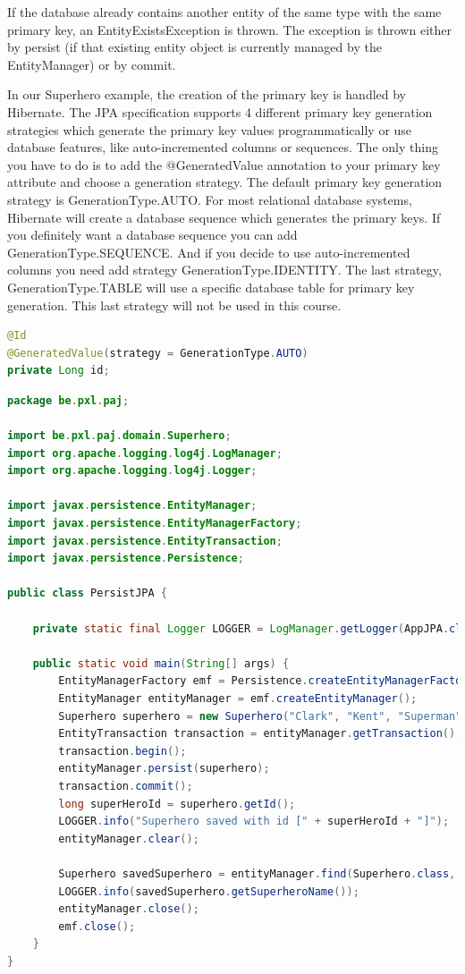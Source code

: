 If the database already contains another entity of the same type with the same primary key, an EntityExistsException is thrown. The exception is thrown either by persist (if that existing entity object is currently managed by the EntityManager) or by commit.

In our Superhero example, the creation of the primary key is handled by Hibernate.
The JPA specification supports 4 different primary key generation strategies which generate the primary key values programmatically or use database features, like auto-incremented columns or sequences. The only thing you have to do is to add the @GeneratedValue annotation to your primary key attribute and choose a generation strategy. The default primary key generation strategy is GenerationType.AUTO. For most relational database systems, Hibernate will create a database sequence which generates the primary keys.  If you definitely want a database sequence you can add GenerationType.SEQUENCE. And if you decide to use auto-incremented columns you need add strategy GenerationType.IDENTITY. 
The last strategy, GenerationType.TABLE will use a specific database table for primary key generation. This last strategy will not be used in this course.

\begin{lstlisting}[frame=single, language=java]
@Id
@GeneratedValue(strategy = GenerationType.AUTO)
private Long id;
\end{lstlisting}


\begin{lstlisting}[frame=single, language=java]
package be.pxl.paj;

import be.pxl.paj.domain.Superhero;
import org.apache.logging.log4j.LogManager;
import org.apache.logging.log4j.Logger;

import javax.persistence.EntityManager;
import javax.persistence.EntityManagerFactory;
import javax.persistence.EntityTransaction;
import javax.persistence.Persistence;

public class PersistJPA {

	private static final Logger LOGGER = LogManager.getLogger(AppJPA.class);

	public static void main(String[] args) {
		EntityManagerFactory emf = Persistence.createEntityManagerFactory("musicdb_pu");
		EntityManager entityManager = emf.createEntityManager();
		Superhero superhero = new Superhero("Clark", "Kent", "Superman");
		EntityTransaction transaction = entityManager.getTransaction();
		transaction.begin();
		entityManager.persist(superhero);
		transaction.commit();
		long superHeroId = superhero.getId();
		LOGGER.info("Superhero saved with id [" + superHeroId + "]");
		entityManager.clear();

		Superhero savedSuperhero = entityManager.find(Superhero.class, superHeroId);
		LOGGER.info(savedSuperhero.getSuperheroName());
		entityManager.close();
		emf.close();
	}
}
\end{lstlisting}

